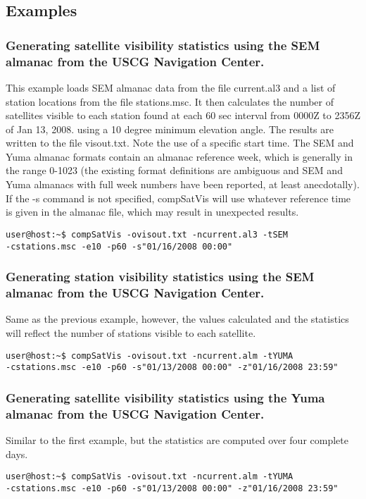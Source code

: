 \subsection{Examples}

\subsubsection{Generating satellite visibility statistics using the SEM almanac from the USCG Navigation Center.}
This example loads SEM almanac data from the file current.al3 and a list of station locations from the file stations.msc. It then calculates the number of satellites visible to each station found at each 60 sec interval from 0000Z to 2356Z of Jan 13, 2008. using a 10 degree minimum elevation angle. The results are written to the file visout.txt. Note the use of a specific start time. The SEM and Yuma almanac formats contain an almanac reference week, which is generally in the range 0-1023 (the existing format definitions are ambiguous and SEM and Yuma almanacs with full week numbers have been reported, at least anecdotally). If the -s command is not specified, compSatVis will use whatever reference time is given in the almanac file, which may result in unexpected results.
\begin{verbatim}
user@host:~$ compSatVis -ovisout.txt -ncurrent.al3 -tSEM 
-cstations.msc -e10 -p60 -s"01/16/2008 00:00"
\end{verbatim}

\subsubsection{Generating station visibility statistics using the SEM almanac from the USCG Navigation Center.}
Same as the previous example, however, the values calculated and the statistics will reflect the number of stations visible to each satellite.
\begin{verbatim}
user@host:~$ compSatVis -ovisout.txt -ncurrent.alm -tYUMA 
-cstations.msc -e10 -p60 -s"01/13/2008 00:00" -z"01/16/2008 23:59"
\end{verbatim}

\subsubsection{Generating satellite visibility statistics using the Yuma almanac from the USCG Navigation Center.}
Similar to the first example, but the statistics are computed over four complete days.
\begin{verbatim}
user@host:~$ compSatVis -ovisout.txt -ncurrent.alm -tYUMA 
-cstations.msc -e10 -p60 -s"01/13/2008 00:00" -z"01/16/2008 23:59"
\end{verbatim}

